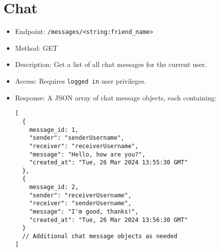 \documentclass[12pt]{article}
\begin{document}
\section{Chat}
\begin{itemize}
    \item Endpoint: \texttt{/messages/<string:friend\_name>}
    \item Method: GET
    \item Description: Get a list of all chat messages for the current user.
    \item Access: Requires \texttt{logged in} user privileges.
    \item Response: A JSON array of chat message objects, each containing:
    \begin{verbatim}
[
  {
    message_id: 1,
    "sender": "senderUsername",
    "receiver": "receiverUsername",
    "message": "Hello, how are you?",
    "created_at": "Tue, 26 Mar 2024 13:55:30 GMT"
  },
  {
    message_id: 2,
    "sender": "receiverUsername",
    "receiver": "senderUsername",
    "message": "I'm good, thanks!",
    "created_at": "Tue, 26 Mar 2024 13:56:30 GMT"
  }
  // Additional chat message objects as needed
]
    \end{verbatim}
\end{itemize}
\end{document}
